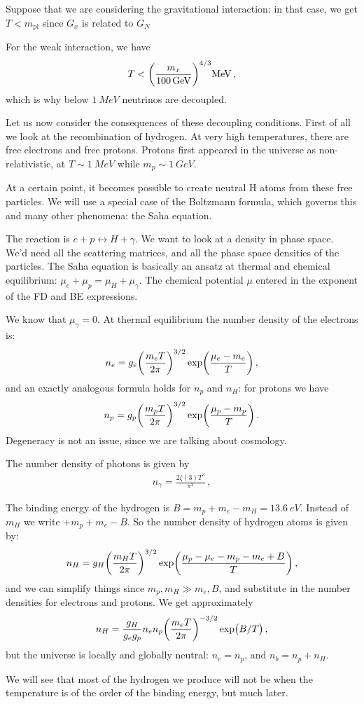 \documentclass[main.tex]{subfiles}
\begin{document}
Suppose that we are considering the gravitational interaction: in that case, we get \(T < m _{\text{pl}}\) since \(G_x\) is related to \( G_N\) 


For the weak interaction, we have 
%
\begin{align}
    T < \qty(\frac{m_x}{\SI{100}{GeV}})^{4/3} \SI{}{MeV}
\,,
\end{align}
%
which is why below \(\SI{1}{MeV}\) neutrinos are decoupled.

Let us now consider the consequences of these decoupling conditions.
First of all we look at the recombination of hydrogen.
At very high temperatures, there are free electrons and free protons.
Protons first appeared in the universe as non-relativistic, at \(T \sim \SI{1}{MeV}\) while \(m_p \sim \SI{1}{GeV}\).

At a certain point, it becomes possible to create neutral H atoms from these free particles.
We will use a special case of the Boltzmann formula, which governs this and many other phenomena: the Saha equation.

The reaction is \(e + p \leftrightarrow H + \gamma \). We want to look at a density in phase space.
We'd need all the scattering matrices, and all the phase space densities of the particles.
The Saha equation is basically an ansatz at thermal and chemical equilibrium: \(\mu _e + \mu_p = \mu_H + \mu_\gamma \). The chemical potential \(\mu \) entered in the exponent of the FD and BE expressions.

We know that \(\mu_{\gamma }=0\).
At thermal equilibrium the number density of the electrons is: 
%
\begin{align}
  n_e = g_e \qty(\frac{m_e T}{2 \pi })^{3/2} \exp(\frac{\mu _e - m_e }{T}) 
\,,
\end{align}
%
and an exactly analogous formula holds for \(n_p\) and \(n_H\): for protons we have 
%
\begin{align}
    n_p = g_p \qty(\frac{m_p T}{2 \pi })^{3/2} \exp(\frac{\mu _p - m_p }{T}) 
  \,.
\end{align}
Degeneracy is not an issue, since we are talking about cosmology.

The number density of photons is given by 
%
\begin{align} \label{eq:n-gamma}
  n_{\gamma } = \frac{2 \zeta (3) T^3}{\pi^2}
\,,
\end{align}
%

The binding energy of the hydrogen is \(B=m_p+m_e-m_H=\SI{13.6}{eV}\). Instead of \(m_H\) we write \(+m_p+m_e-B\). So the number density of hydrogen atoms is given by: 
%
\begin{align}
  n_H = g_H \qty(\frac{m_H T}{2 \pi })^{3/2} \exp(\frac{\mu_p - \mu_e - m_p - m_e + B}{T})
\,,
\end{align}
%
and we can simplify things since \(m_p, m_H \gg m_e, B\), and substitute in the number densities for electrons and protons.
We get approximately
%
\begin{align}
  n_H = \frac{g_H}{g_e g_p} n_e n_p \qty(\frac{m_e T}{2 \pi })^{-3/2}\exp(B/T)
\,,
\end{align}
%
but the universe is locally and globally neutral: \(n_e = n_p\), and \(n_b = n_p + n_H\). 

We will see that most of the hydrogen we produce will not be when the temperature is of the order of the binding energy, but much later.
\end{document}
